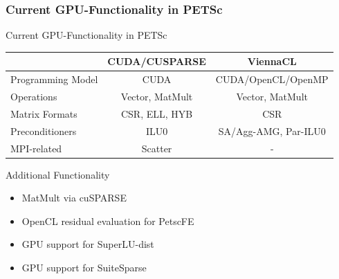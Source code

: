 \begin{frame}[fragile]
\frametitle{Current GPU-Functionality in PETSc}
  
  \begin{block}{Current GPU-Functionality in PETSc}
  \begin{center}
  \renewcommand{\arraystretch}{1.2}
  \begin{tabular}{|l|c|c|}
   \hline
                     & \textbf{CUDA/CUSPARSE}  & \textbf{ViennaCL} \\
   \hline
   Programming Model & CUDA                & CUDA/OpenCL/OpenMP \\
   \hline
   Operations        & Vector, MatMult     & Vector, MatMult \\
   \hline
   Matrix Formats    & CSR, ELL, HYB       & CSR \\
   \hline
   Preconditioners   & ILU0                & SA/Agg-AMG, Par-ILU0 \\
   \hline
   MPI-related       & Scatter             & - \\
   \hline
  \end{tabular}
  \end{center}
  \end{block}

  \begin{block}{Additional Functionality}
   \begin{itemize}
    \item MatMult via cuSPARSE
    \item OpenCL residual evaluation for PetscFE
    \item GPU support for SuperLU-dist
    \item GPU support for SuiteSparse
   \end{itemize}
  \end{block}


\end{frame}



